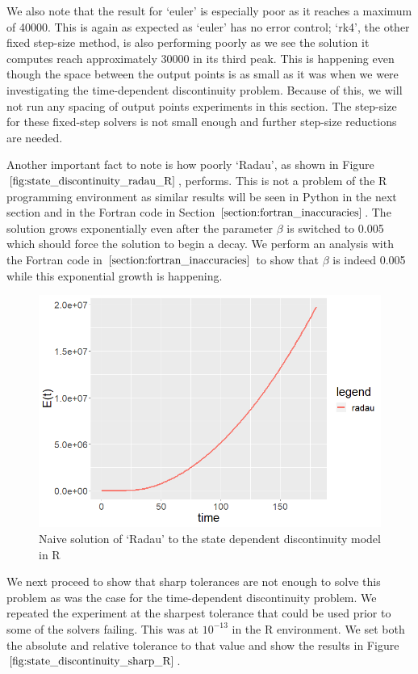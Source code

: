 We also note that the result for `euler' is especially poor as it reaches a maximum of 40000. This is again as expected as `euler' has no error control; `rk4', the other fixed step-size method, is also performing poorly as we see the solution it computes reach approximately 30000 in its third peak. This is happening even though the space between the output points is as small as it was when we were investigating the time-dependent discontinuity problem. Because of this, we will not run any spacing of output points experiments in this section. The step-size for these fixed-step solvers is not small enough and further step-size reductions are needed.

Another important fact to note is how poorly `Radau', as shown in Figure $\ref{fig:state_discontinuity_radau_R}$, performs. This is not a problem of the R programming environment as similar results will be seen in Python in the next section and in the Fortran code in Section $\ref{section:fortran_inaccuracies}$. The solution grows exponentially even after the parameter $\beta$ is switched to 0.005 which should force the solution to begin a decay. We perform an analysis with the Fortran code in $\ref{section:fortran_inaccuracies}$ to show that $\beta$ is indeed 0.005 while this exponential growth is happening. 

\begin{figure}[h]
\centering
\includegraphics[width=0.7\linewidth]{./figures/state_discontinuity_radau_R}
\caption{Naive solution of `Radau' to the state dependent discontinuity model in R}
\label{fig:state_discontinuity_radau_R}
\end{figure}

We next proceed to show that sharp tolerances are not enough to solve this problem as was the case for the time-dependent discontinuity problem. We repeated the experiment at the sharpest tolerance that could be used prior to some of the solvers failing. This was at $10^{-13}$ in the R environment. We set both the absolute and relative tolerance to that value and show the results in Figure $\ref{fig:state_discontinuity_sharp_R}$.


